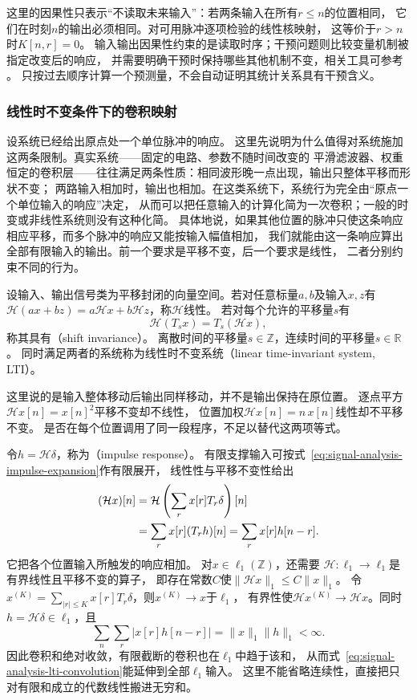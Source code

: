 这里的因果性只表示“不读取未来输入”：若两条输入在所有$r\leq n$的位置相同，
它们在时刻$n$的输出必须相同。对可用脉冲逐项检验的线性核映射，
这等价于$r>n$时$K[n,r]=0$。
输入输出因果性约束的是读取时序；干预问题则比较变量机制被指定改变后的响应，
并需要明确干预时保持哪些其他机制不变，相关工具可参考
。
只按过去顺序计算一个预测量，不会自动证明其统计关系具有干预含义。

\subsubsection{线性时不变条件下的卷积映射}
\label{sec:signal-analysis-lti-convolution}

设系统已经给出原点处一个单位脉冲的响应。
这里先说明为什么值得对系统施加这两条限制。真实系统——固定的电路、参数不随时间改变的
平滑滤波器、权重恒定的卷积层——往往满足两条性质：相同波形晚一点出现，输出只整体平移而形状不变；
两路输入相加时，输出也相加。在这类系统下，系统行为完全由“原点一个单位输入的响应”决定，
从而可以把任意输入的计算化简为一次卷积；一般的时变或非线性系统则没有这种化简。
具体地说，如果其他位置的脉冲只使这条响应相应平移，而多个脉冲的响应又能按输入幅值相加，
我们就能由这一条响应算出全部有限输入的输出。前一个要求是平移不变，后一个要求是线性，
二者分别约束不同的行为。
\begin{definition}[线性时不变系统]
  \label{def:signal-analysis-lti-system}
  设输入、输出信号类为平移封闭的向量空间。若对任意标量$a,b$及输入$x,z$有
  $\mathcal H(ax+bz)=a\mathcal Hx+b\mathcal Hz$，称$\mathcal H$线性。
  若对每个允许的平移量$s$有
  \[
    \mathcal H(T_sx)=T_s(\mathcal Hx),
  \]
  称其具有（shift invariance）。
  离散时间的平移量$s\in\mathbb Z$，连续时间的平移量$s\in\mathbb R$。
  同时满足两者的系统称为线性时不变系统（linear time-invariant system, LTI）。
\end{definition}
这里说的是输入整体移动后输出同样移动，并不是输出保持在原位置。
逐点平方$\mathcal Hx[n]=x[n]^2$平移不变却不线性，
位置加权$\mathcal Hx[n]=n\,x[n]$线性却不平移不变。
是否在每个位置调用了同一段程序，不足以替代这两项等式。

令$h=\mathcal H\delta$，称为（impulse response）。
有限支撑输入可按式~\eqref{eq:signal-analysis-impulse-expansion}作有限展开，
线性性与平移不变性给出
\begin{align}
  (\mathcal Hx)[n]
  &=\mathcal H\left(\sum_r x[r]T_r\delta\right)[n]\notag\\
  &=\sum_r x[r](T_rh)[n]=\sum_r x[r]h[n-r].
  \label{eq:signal-analysis-lti-convolution}
\end{align}
它把各个位置输入所触发的响应相加。
对$x\in\ell_1(\mathbb Z)$，还需要
$\mathcal H:\ell_1\to\ell_1$是有界线性且平移不变的算子，
即存在常数$C$使$\|\mathcal Hx\|_1\leq C\|x\|_1$。
令$x^{(K)}=\sum_{|r|\leq K}x[r]T_r\delta$，则$x^{(K)}\to x$于$\ell_1$，
有界性使$\mathcal Hx^{(K)}\to\mathcal Hx$。同时$h=\mathcal H\delta\in\ell_1$，且
\[
  \sum_n\sum_r|x[r]h[n-r]|=\|x\|_1\|h\|_1<\infty.
\]
因此卷积和绝对收敛，有限截断的卷积也在$\ell_1$中趋于该和，
从而式~\eqref{eq:signal-analysis-lti-convolution}能延伸到全部$\ell_1$输入。
这里不能省略连续性，直接把只对有限和成立的代数线性搬进无穷和。

